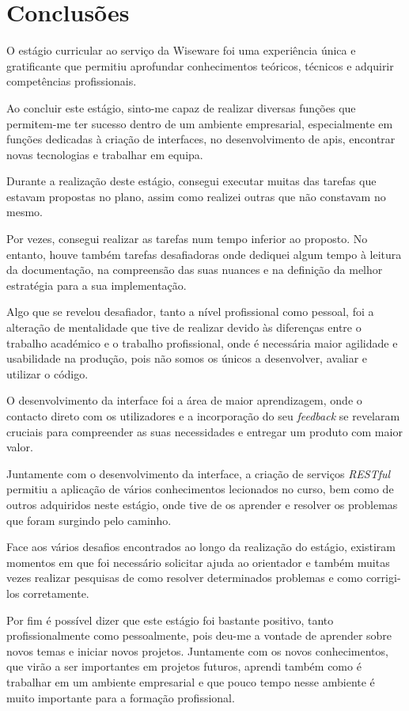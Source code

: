 \chapter{Conclusões}\label{chapter:conclusion}
O estágio curricular ao serviço da Wiseware foi uma experiência única e gratificante que permitiu aprofundar conhecimentos teóricos, técnicos e adquirir competências profissionais.
\newline

Ao concluir este estágio, sinto-me capaz de realizar diversas funções que permitem-me ter sucesso dentro de um ambiente empresarial, especialmente em funções dedicadas à criação de interfaces, no desenvolvimento de \acs{api}s, encontrar novas tecnologias e trabalhar em equipa.
\newline

Durante a realização deste estágio, consegui executar muitas das tarefas que estavam propostas no plano, assim como realizei outras que não constavam no mesmo.

Por vezes, consegui realizar as tarefas num tempo inferior ao proposto. No entanto, houve também tarefas desafiadoras onde dediquei algum tempo à leitura da documentação, na compreensão das suas nuances e na definição da melhor estratégia para a sua implementação.
\newline

Algo que se revelou desafiador, tanto a nível profissional como pessoal, foi a alteração de mentalidade que tive de realizar devido às diferenças entre o trabalho académico e o trabalho profissional, onde é necessária maior agilidade e usabilidade na produção, pois não somos os únicos a desenvolver, avaliar e utilizar o código.
\newline

O desenvolvimento da interface foi a área de maior aprendizagem, onde o contacto direto com os utilizadores e a incorporação do seu \textit{feedback} se revelaram cruciais para compreender as suas necessidades e entregar um produto com maior valor.
\newline

Juntamente com o desenvolvimento da interface, a criação de serviços \textit{RESTful} permitiu a aplicação de vários conhecimentos lecionados no curso, bem como de outros adquiridos neste estágio, onde tive de os aprender e resolver os problemas que foram surgindo pelo caminho.
\newline

Face aos vários desafios encontrados ao longo da realização do estágio, existiram momentos em que foi necessário solicitar ajuda ao orientador e também muitas vezes realizar pesquisas de como resolver determinados problemas e como corrigi-los corretamente.
\newline

Por fim é possível dizer que este estágio foi bastante positivo, tanto profissionalmente como pessoalmente, pois deu-me a vontade de aprender sobre novos temas e iniciar novos projetos. Juntamente com os novos conhecimentos, que virão a ser importantes em projetos futuros, aprendi também como é trabalhar em um ambiente empresarial e que pouco tempo nesse ambiente é muito importante para a formação profissional.